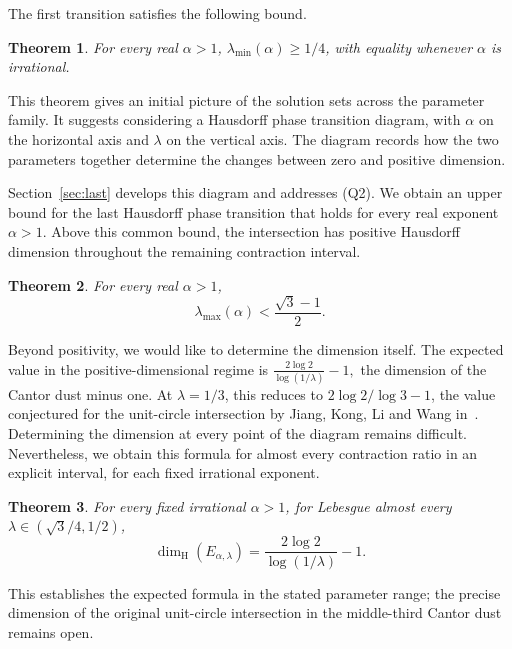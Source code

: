 \documentclass[11pt,a4paper]{amsart}
\numberwithin{equation}{section}
\newtheorem{theorem}{Theorem}[section]
\theoremstyle{definition}
\begin{document}
The first transition satisfies the following bound.
\begin{theorem}\label{intro:irrational-onset}
For every real \(\alpha>1\), \(\lambda_{\min}(\alpha)\geq1/4\),
with equality whenever \(\alpha\) is irrational.
\end{theorem}



This theorem gives an initial picture of the solution sets across
the parameter family. It suggests considering a Hausdorff phase
transition diagram, with \(\alpha\) on the horizontal axis and \(\lambda\)
on the vertical axis. The diagram records how the two parameters
together determine the changes between zero and positive dimension.

Section~\ref{sec:last} develops this diagram and addresses (Q2).
We obtain an upper bound for the last Hausdorff phase transition
that holds for every real exponent \(\alpha>1\).
Above this common bound, the intersection has positive Hausdorff
dimension throughout the remaining contraction interval.

\begin{theorem}\label{intro:last-real}
For every real \(\alpha>1\),
\[
\lambda_{\max}(\alpha)<\frac{\sqrt3-1}{2}.
\]
\end{theorem}

Beyond positivity, we would like to determine the dimension itself.
The expected value in the positive-dimensional regime is
$
\frac{2\log2}{\log(1/\lambda)}-1,
$
the dimension of the Cantor dust minus one. At \(\lambda=1/3\),
this reduces to \(2\log2/\log3-1\), the value conjectured for the
unit-circle intersection by Jiang, Kong, Li and Wang
in~\cite[Question~5.1]{Jiang2026}.
Determining the dimension at every point of the diagram remains
difficult. Nevertheless, we obtain this formula for almost every
contraction ratio in an explicit interval, for each fixed irrational
exponent.

\begin{theorem}\label{intro:ae-dimension}
For every fixed irrational \(\alpha>1\), for Lebesgue almost every
\(\lambda\in(\sqrt3/4,1/2)\),
\[
\dim_{\mathrm H}(E_{\alpha,\lambda})
=\frac{2\log2}{\log(1/\lambda)}-1.
\]
\end{theorem}

This establishes the expected formula in the stated parameter range;
the precise dimension of the original unit-circle intersection in
the middle-third Cantor dust remains open.
\end{document}
